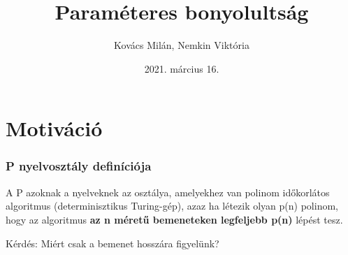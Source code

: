 \documentclass[aspectratio=169]{beamer}
\begin{document}
\title{Paraméteres bonyolultság}
\author{Kovács Milán, Nemkin Viktória}
\date{2021. március 16.}

\frame{\titlepage}



\section{Motiváció}

\begin{frame}
\frametitle{P nyelvosztály definíciója}

A P azoknak a nyelveknek az osztálya, amelyekhez van polinom időkorlátos
algoritmus (determinisztikus Turing-gép), azaz ha létezik olyan p(n) polinom, hogy
az algoritmus \textbf{az n méretű bemeneteken legfeljebb p(n)} lépést tesz.

Kérdés: Miért csak a bemenet hosszára figyelünk? 

\end{frame}
\end{document}
